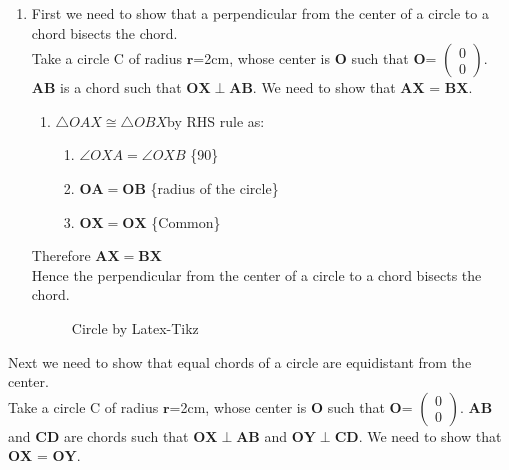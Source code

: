 \renewcommand{\vec}[1]{\mathbf{#1}}
 \begin{enumerate}


\item First we need to show that a perpendicular from the center of a circle to a chord bisects the chord.\\

Take a circle C of radius $\vec{r}$=2cm, whose center is $\vec{O}$ such that $ \vec{O}$= $\begin{pmatrix}0\\0\end{pmatrix}$. 
$\vec{AB}$ is a chord such that $\vec{OX} \perp \vec{AB}$. We need to show that $\vec{AX}$ = $\vec{BX}$.
\newline
 
\begin{enumerate}
	\item $\triangle OAX \cong \triangle OBX $by RHS rule as: 
	\begin{enumerate}
	\item $\angle{OXA} = \angle{OXB} $ \quad \{90\degree\}
	\item $\vec{OA} = \vec{OB}$ \quad \{radius of the circle\}
	\item $\vec{OX} = \vec{OX}$ \quad \{Common\}
	\end{enumerate}
\end{enumerate}
	Therefore $\vec{AX} = \vec{BX}$\\
	Hence the perpendicular from the center of a circle to a chord bisects the chord.

  
\begin{figure}[!ht]
\centering
\resizebox{\columnwidth}{!}{}
\caption{Circle by Latex-Tikz}
\label{fig:stepone}	
\end{figure}
\end{enumerate}




\item Next we need to show that equal chords of a circle are equidistant from the center.\\

Take a circle C of radius $\vec{r}$=2cm, whose center is $\vec{O}$ such that $ \vec{O}$= $\begin{pmatrix}0\\0\end{pmatrix}$. 
$\vec{AB}$ and $\vec{CD}$ are chords such that $\vec{OX} \perp \vec{AB}$ and $\vec{OY} \perp \vec{CD}$. We need to show that $\vec{OX}$ = $\vec{OY}$.
\newline
 

